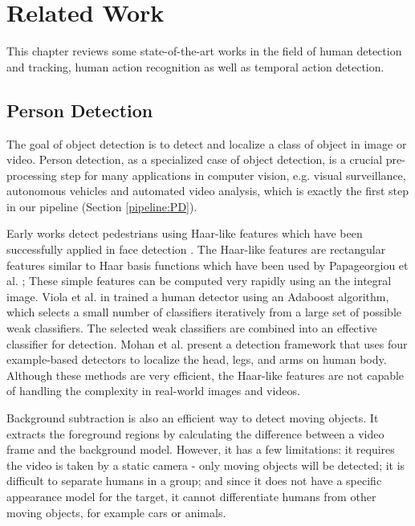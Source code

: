 
\chapter{Related Work}
\label{sec:related_work}

This chapter reviews some state-of-the-art works in the field of human detection and tracking, human action recognition as well as temporal action detection.

\section{Person Detection}
\label{related_work:pd}
The goal of object detection is to detect and localize a class of object in image or video. Person detection, as a specialized case of object detection, is a crucial pre-processing step for
many applications in computer vision, e.g. visual surveillance, autonomous vehicles and automated
video analysis, which is exactly the first step in our pipeline (Section \ref{pipeline:PD}). 

Early works \cite{Mohan:2001:EOD:377051.377062, viola2003} detect pedestrians using Haar-like features which have been successfully applied in face detection \cite{viola2001}. The Haar-like features are rectangular features similar to Haar basis functions which have been used by Papageorgiou et al. \cite{papag1998}; These simple features can be computed very rapidly using an the integral image. Viola et al. in \cite{viola2003} trained a human detector using an Adaboost algorithm, which selects a small number of classifiers iteratively from a large set of possible weak classifiers. The selected weak classifiers are combined into an effective classifier for detection. Mohan et al. \cite{Mohan:2001:EOD:377051.377062} present a detection framework that uses four example-based detectors to localize the head, legs, and arms on human body. Although these methods are very efficient, the Haar-like features are not capable of handling the complexity in real-world images and videos.

Background subtraction \cite{Elgammal2000, Siden2003, stau1999, toyama1999} is also an efficient way to detect moving objects. It extracts the foreground regions by calculating the difference between a video frame and the background model. However, it has a few limitations: it requires the video is taken by a static camera - only moving objects will be detected; it is difficult to separate humans in a group; and since it does not have a specific appearance model for the target, it cannot differentiate humans from other moving objects, for example cars or animals.

